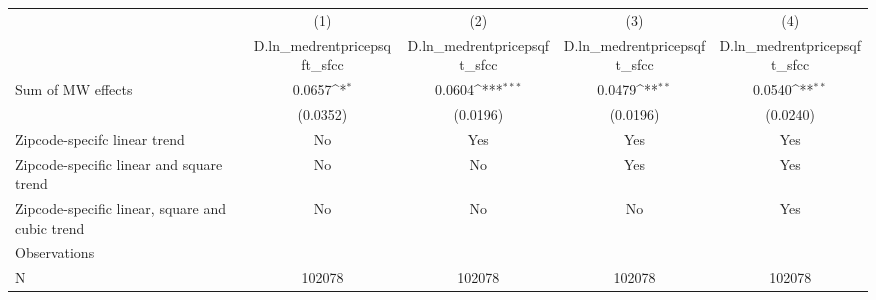 {
\def\sym#1{\ifmmode^{#1}\else\(^{#1}\)\fi}
\begin{tabular}{l*{4}{c}}
\hline\hline
          &\multicolumn{1}{c}{(1)}&\multicolumn{1}{c}{(2)}&\multicolumn{1}{c}{(3)}&\multicolumn{1}{c}{(4)}\\
          &\multicolumn{1}{c}{D.ln\_medrentpricepsqft\_sfcc}&\multicolumn{1}{c}{D.ln\_medrentpricepsqft\_sfcc}&\multicolumn{1}{c}{D.ln\_medrentpricepsqft\_sfcc}&\multicolumn{1}{c}{D.ln\_medrentpricepsqft\_sfcc}\\
\hline
Sum of MW effects&   0.0657\sym{*}  &   0.0604\sym{***}&   0.0479\sym{**} &   0.0540\sym{**} \\
          & (0.0352)         & (0.0196)         & (0.0196)         & (0.0240)         \\
\hline
Zipcode-specifc linear trend&       No         &      Yes         &      Yes         &      Yes         \\
Zipcode-specific linear and square trend&       No         &       No         &      Yes         &      Yes         \\
Zipcode-specific linear, square and cubic trend&       No         &       No         &       No         &      Yes         \\
Observations&                  &                  &                  &                  \\
N         &   102078         &   102078         &   102078         &   102078         \\
\hline\hline
\end{tabular}
}
